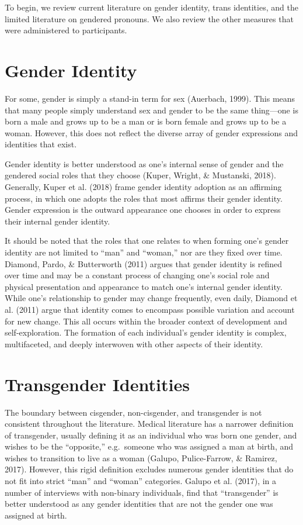 \documentclass[12pt,twoside]{reedthesis}
\begin{document}
To begin, we review current literature on gender identity, trans identities, and the limited literature on gendered pronouns. We also review the other measures that were administered to participants.

\hypertarget{gender-identity}{%
\section{Gender Identity}\label{gender-identity}}

For some, gender is simply a stand-in term for sex (Auerbach, 1999). This means that many people simply understand sex and gender to be the same thing---one is born a male and grows up to be a man or is born female and grows up to be a woman. However, this does not reflect the diverse array of gender expressions and identities that exist.

Gender identity is better understood as one's internal sense of gender and the gendered social roles that they choose (Kuper, Wright, \& Mustanski, 2018). Generally, Kuper et al. (2018) frame gender identity adoption as an affirming process, in which one adopts the roles that most affirms their gender identity. Gender expression is the outward appearance one chooses in order to express their internal gender identity.

It should be noted that the roles that one relates to when forming one's gender identity are not limited to ``man'' and ``woman,'' nor are they fixed over time. Diamond, Pardo, \& Butterworth (2011) argues that gender identity is refined over time and may be a constant process of changing one's social role and physical presentation and appearance to match one's internal gender identity. While one's relationship to gender may change frequently, even daily, Diamond et al. (2011) argue that identity comes to encompass possible variation and account for new change. This all occurs within the broader context of development and self-exploration. The formation of each individual's gender identity is complex, multifaceted, and deeply interwoven with other aspects of their identity.

\hypertarget{transgender-identities}{%
\section{Transgender Identities}\label{transgender-identities}}

The boundary between cisgender, non-cisgender, and transgender is not consistent throughout the literature. Medical literature has a narrower definition of transgender, usually defining it as an individual who was born one gender, and wishes to be the ``opposite,'' e.g.~someone who was assigned a man at birth, and wishes to transition to live as a woman (Galupo, Pulice-Farrow, \& Ramirez, 2017). However, this rigid definition excludes numerous gender identities that do not fit into strict ``man'' and ``woman'' categories. Galupo et al. (2017), in a number of interviews with non-binary individuals, find that ``transgender'' is better understood as any gender identities that are not the gender one was assigned at birth.
\end{document}

